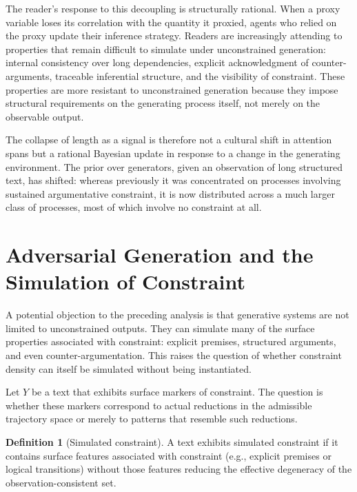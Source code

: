 \documentclass[12pt, oneside]{article}
\theoremstyle{plain}
\theoremstyle{definition}
\newtheorem{definition}[theorem]{Definition}
\theoremstyle{remark}
\begin{document}
The reader's response to this decoupling is structurally rational. When a proxy variable
loses its correlation with the quantity it proxied, agents who relied on the proxy update
their inference strategy. Readers are increasingly attending to properties that remain
difficult to simulate under unconstrained generation: internal consistency over long
dependencies, explicit acknowledgment of counter-arguments, traceable inferential structure,
and the visibility of constraint. These properties are more resistant to unconstrained
generation because they impose structural requirements on the generating process itself,
not merely on the observable output.

The collapse of length as a signal is therefore not a cultural shift in attention spans
but a rational Bayesian update in response to a change in the generating environment. The
prior over generators, given an observation of long structured text, has shifted: whereas
previously it was concentrated on processes involving sustained argumentative constraint,
it is now distributed across a much larger class of processes, most of which involve no
constraint at all.

\section{Adversarial Generation and the Simulation of Constraint}

A potential objection to the preceding analysis is that generative systems are not
limited to unconstrained outputs. They can simulate many of the surface properties
associated with constraint: explicit premises, structured arguments, and even
counter-argumentation. This raises the question of whether constraint density can
itself be simulated without being instantiated.

Let $Y$ be a text that exhibits surface markers of constraint. The question is
whether these markers correspond to actual reductions in the admissible trajectory
space or merely to patterns that resemble such reductions.

\begin{definition}[Simulated constraint]
A text exhibits simulated constraint if it contains surface features associated
with constraint (e.g., explicit premises or logical transitions) without those
features reducing the effective degeneracy of the observation-consistent set.
\end{definition}
\end{document}
